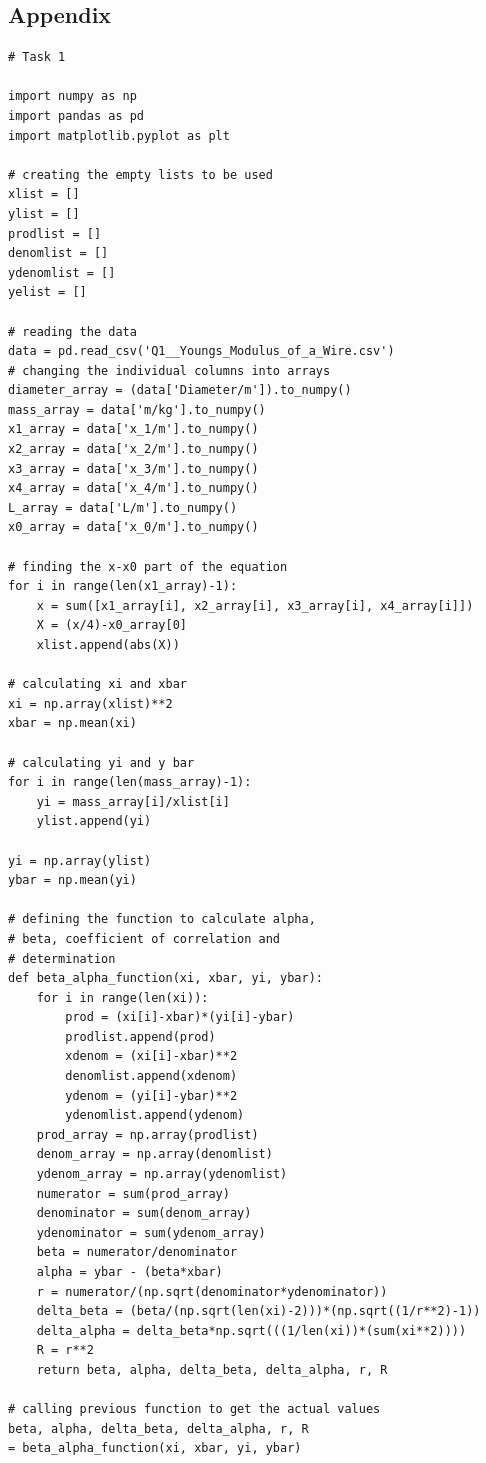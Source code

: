 \documentclass[12pt, a4paper]{article}
\begin{document}
\subsection{Appendix}
\begin{verbatim}
# Task 1

import numpy as np
import pandas as pd
import matplotlib.pyplot as plt

# creating the empty lists to be used
xlist = []
ylist = []
prodlist = []
denomlist = []
ydenomlist = []
yelist = []

# reading the data
data = pd.read_csv('Q1__Youngs_Modulus_of_a_Wire.csv')
# changing the individual columns into arrays
diameter_array = (data['Diameter/m']).to_numpy()
mass_array = data['m/kg'].to_numpy()
x1_array = data['x_1/m'].to_numpy()
x2_array = data['x_2/m'].to_numpy()
x3_array = data['x_3/m'].to_numpy()
x4_array = data['x_4/m'].to_numpy()
L_array = data['L/m'].to_numpy()
x0_array = data['x_0/m'].to_numpy()

# finding the x-x0 part of the equation
for i in range(len(x1_array)-1):
    x = sum([x1_array[i], x2_array[i], x3_array[i], x4_array[i]])
    X = (x/4)-x0_array[0]
    xlist.append(abs(X))

# calculating xi and xbar
xi = np.array(xlist)**2
xbar = np.mean(xi)

# calculating yi and y bar
for i in range(len(mass_array)-1):
    yi = mass_array[i]/xlist[i]
    ylist.append(yi)

yi = np.array(ylist)
ybar = np.mean(yi)

# defining the function to calculate alpha, 
# beta, coefficient of correlation and 
# determination
def beta_alpha_function(xi, xbar, yi, ybar):
    for i in range(len(xi)):
        prod = (xi[i]-xbar)*(yi[i]-ybar)
        prodlist.append(prod)
        xdenom = (xi[i]-xbar)**2
        denomlist.append(xdenom)
        ydenom = (yi[i]-ybar)**2
        ydenomlist.append(ydenom)
    prod_array = np.array(prodlist)
    denom_array = np.array(denomlist)
    ydenom_array = np.array(ydenomlist)
    numerator = sum(prod_array)
    denominator = sum(denom_array)
    ydenominator = sum(ydenom_array)
    beta = numerator/denominator
    alpha = ybar - (beta*xbar)
    r = numerator/(np.sqrt(denominator*ydenominator))
    delta_beta = (beta/(np.sqrt(len(xi)-2)))*(np.sqrt((1/r**2)-1))
    delta_alpha = delta_beta*np.sqrt(((1/len(xi))*(sum(xi**2))))
    R = r**2
    return beta, alpha, delta_beta, delta_alpha, r, R

# calling previous function to get the actual values
beta, alpha, delta_beta, delta_alpha, r, R 
= beta_alpha_function(xi, xbar, yi, ybar)


\end{verbatim}
\end{document}
